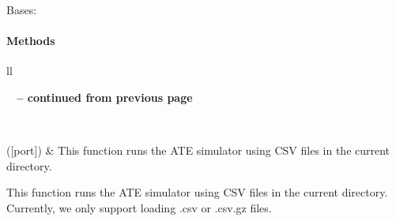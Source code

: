 \documentclass[letterpaper,10pt,english]{sphinxmanual}
\begin{document}
\begin{fulllineitems}
\label{qikify.recipes:qikify.recipes.atesim.ATESimulator}
Bases: 
\paragraph{Methods}

\begin{longtable}{ll}
\hline
\endfirsthead

%
{{\bfseries \tablename\ \thetable{} -- continued from previous page}} \\
\hline
\endhead

\hline {} \\ \hline
\endfoot

\hline
\endlastfoot


{\hyperref[qikify.recipes:qikify.recipes.atesim.ATESimulator.run]{}}({[}port{]})
 & 
This function runs the ATE simulator using CSV files in the current directory.
\\\hline
\end{longtable}


\begin{fulllineitems}
\label{qikify.recipes:qikify.recipes.atesim.ATESimulator.run}
This function runs the ATE simulator using CSV files in the current directory.
Currently, we only support loading .csv or .csv.gz files.

\end{fulllineitems}


\end{fulllineitems}

\end{document}
